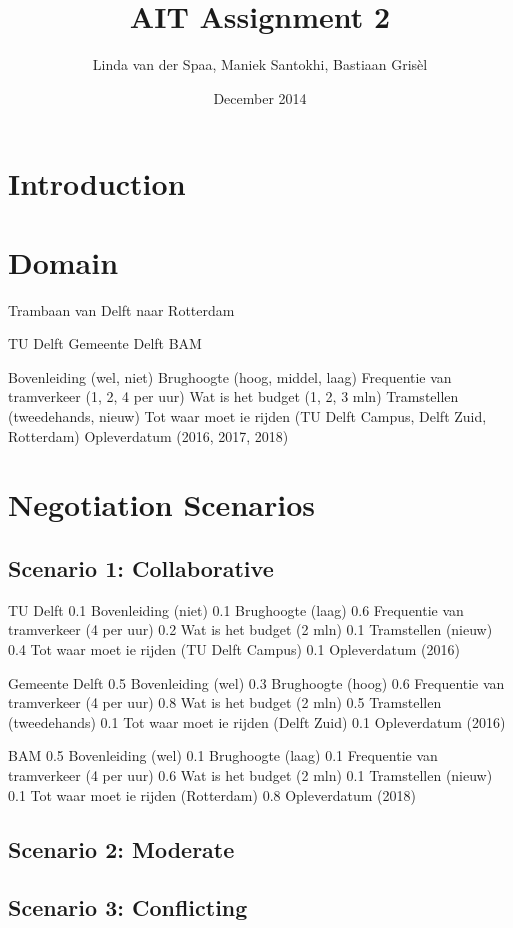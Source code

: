 \documentclass{article}
\title{AIT Assignment 2}
\author{Linda van der Spaa, Maniek Santokhi, Bastiaan Gris\`el}
\date{December 2014}
\begin{document}
\maketitle

\section{Introduction}

\section{Domain}
Trambaan van Delft naar Rotterdam

TU Delft
Gemeente Delft
BAM

Bovenleiding (wel, niet)
Brughoogte (hoog, middel, laag)
Frequentie van tramverkeer (1, 2, 4 per uur)
Wat is het budget (1, 2, 3 mln)
Tramstellen (tweedehands, nieuw)
Tot waar moet ie rijden (TU Delft Campus, Delft Zuid, Rotterdam)
Opleverdatum (2016, 2017, 2018)


\section{Negotiation Scenarios}

\subsection{Scenario 1: Collaborative}
TU Delft
0.1 Bovenleiding (niet)
0.1 Brughoogte (laag)
0.6 Frequentie van tramverkeer (4 per uur)
0.2 Wat is het budget (2 mln)
0.1 Tramstellen (nieuw)
0.4 Tot waar moet ie rijden (TU Delft Campus)
0.1 Opleverdatum (2016)

Gemeente Delft
0.5 Bovenleiding (wel)
0.3 Brughoogte (hoog)
0.6 Frequentie van tramverkeer (4 per uur)
0.8 Wat is het budget (2 mln)
0.5 Tramstellen (tweedehands)
0.1 Tot waar moet ie rijden (Delft Zuid)
0.1 Opleverdatum (2016)

BAM
0.5 Bovenleiding (wel)
0.1 Brughoogte (laag)
0.1 Frequentie van tramverkeer (4 per uur)
0.6 Wat is het budget (2 mln)
0.1 Tramstellen (nieuw)
0.1 Tot waar moet ie rijden (Rotterdam)
0.8 Opleverdatum (2018)

\subsection{Scenario 2: Moderate}


\subsection{Scenario 3: Conflicting}
\end{document}
